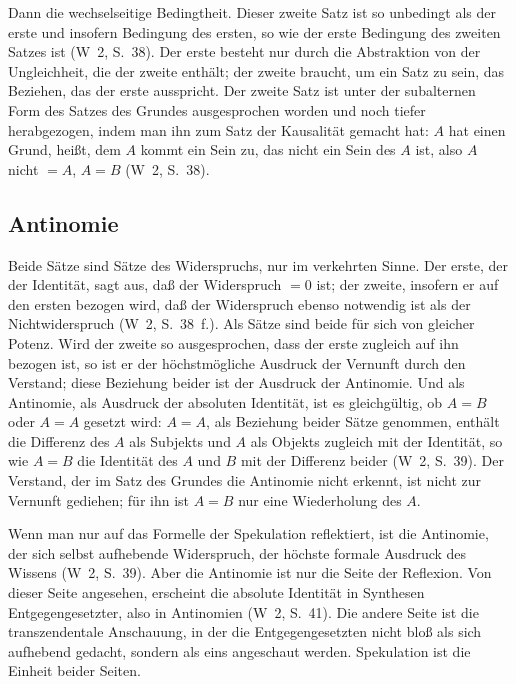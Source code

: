 \documentclass[11pt,a4paper]{article}
\newcommand{\Werke}[1]{(W~2, S.~#1)}
\begin{document}
Dann die wechselseitige Bedingtheit. \glqq Dieser zweite Satz ist so unbedingt als der erste und insofern Bedingung des ersten, so wie der erste Bedingung des zweiten Satzes ist\grqq{} \Werke{38}. Der erste besteht nur durch die Abstraktion von der Ungleichheit, die der zweite enthält; der zweite braucht, um ein Satz zu sein, das Beziehen, das der erste ausspricht. Der zweite Satz ist \glqq unter der subalternen Form des Satzes des Grundes ausgesprochen worden\grqq{} und noch tiefer herabgezogen, indem man ihn zum Satz der Kausalität gemacht hat: $A$ hat einen Grund, heißt, dem $A$ kommt ein Sein zu, das nicht ein Sein des $A$ ist, also $A$ nicht $= A$, $A = B$ \Werke{38}.

\subsection{Antinomie}

\glqq Beide Sätze sind Sätze des Widerspruchs, nur im verkehrten Sinne. Der erste, der der Identität, sagt aus, daß der Widerspruch $= 0$ ist; der zweite, insofern er auf den ersten bezogen wird, daß der Widerspruch ebenso notwendig ist als der Nichtwiderspruch\grqq{} \Werke{38~f.}. Als Sätze sind beide für sich von gleicher Potenz. Wird der zweite so ausgesprochen, dass der erste zugleich auf ihn bezogen ist, so ist er \glqq der höchstmögliche Ausdruck der Vernunft durch den Verstand; diese Beziehung beider ist der Ausdruck der Antinomie\grqq{}. Und als Antinomie, \glqq als Ausdruck der absoluten Identität\grqq{}, ist es gleichgültig, ob $A = B$ oder $A = A$ gesetzt wird: $A = A$, als Beziehung beider Sätze genommen, \glqq enthält die Differenz des $A$ als Subjekts und $A$ als Objekts zugleich mit der Identität, so wie $A = B$ die Identität des $A$ und $B$ mit der Differenz beider\grqq{} \Werke{39}. Der Verstand, der im Satz des Grundes die Antinomie nicht erkennt, ist nicht zur Vernunft gediehen; für ihn ist $A = B$ nur eine Wiederholung des $A$.

Wenn man nur auf das Formelle der Spekulation reflektiert, ist die Antinomie, \glqq der sich selbst aufhebende Widerspruch\grqq{}, der höchste formale Ausdruck des Wissens \Werke{39}. Aber die Antinomie ist nur die Seite der Reflexion. Von dieser Seite angesehen, \glqq erscheint die absolute Identität in Synthesen Entgegengesetzter, also in Antinomien\grqq{} \Werke{41}. Die andere Seite ist die transzendentale Anschauung, in der die Entgegengesetzten nicht bloß als sich aufhebend gedacht, sondern als eins angeschaut werden. Spekulation ist die Einheit beider Seiten.
\end{document}
